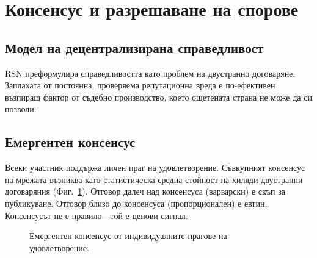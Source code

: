 \documentclass[11pt,a4paper,twocolumn]{article}
\begin{document}
\section{Консенсус и разрешаване на спорове}

\subsection{Модел на децентрализирана справедливост}

RSN преформулира справедливостта като проблем на двустранно договаряне. Заплахата от постоянна, проверяема репутационна вреда е по-ефективен възпиращ фактор от съдебно производство, което ощетената страна не може да си позволи.

\subsection{Емергентен консенсус}

Всеки участник поддържа личен праг на удовлетворение. Съвкупният консенсус на мрежата възниква като статистическа средна стойност на хиляди двустранни договаряния (Фиг.~\ref{fig:consensus}). Отговор далеч над консенсуса (варварски) е скъп за публикуване. Отговор близо до консенсуса (пропорционален) е евтин. Консенсусът не е правило---той е ценови сигнал.

\begin{figure}[ht]
\centering
{}
\caption{Емергентен консенсус от индивидуалните прагове на удовлетворение.}
\label{fig:consensus}
\end{figure}
\end{document}
